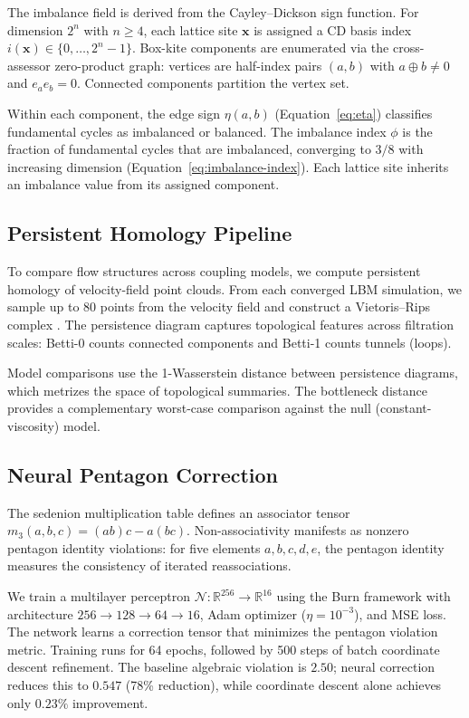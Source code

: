 \documentclass[12pt]{article}
\theoremstyle{definition}
\theoremstyle{plain}
\theoremstyle{remark}
\begin{document}
The imbalance field is derived from the Cayley--Dickson sign function.
For dimension $2^n$ with $n \geq 4$, each lattice site $\mathbf{x}$ is
assigned a CD basis index $i(\mathbf{x}) \in \{0, \ldots, 2^n - 1\}$.
Box-kite components are enumerated via the cross-assessor zero-product
graph: vertices are half-index pairs $(a, b)$ with $a \oplus b \neq 0$ and
$e_a e_b = 0$.  Connected components partition the vertex set.

Within each component, the edge sign $\eta(a,b)$ (Equation~\ref{eq:eta})
classifies fundamental cycles as imbalanced or balanced.  The
imbalance index $\phi$ is the fraction of fundamental cycles that are
imbalanced, converging to $3/8$ with increasing dimension
(Equation~\ref{eq:imbalance-index}).  Each lattice site inherits an imbalance
value from its assigned component.

\subsection{Persistent Homology Pipeline}
\label{sec:topology}

To compare flow structures across coupling models, we compute persistent
homology of velocity-field point clouds.  From each converged LBM
simulation, we sample up to 80 points from the velocity field and construct
a Vietoris--Rips complex \cite{EdelsbrunnerHarer2010}.  The persistence
diagram captures topological features across filtration scales:
Betti-0 counts connected components and Betti-1 counts tunnels (loops).

Model comparisons use the 1-Wasserstein distance between persistence
diagrams, which metrizes the space of topological summaries.  The
bottleneck distance provides a complementary worst-case comparison against
the null (constant-viscosity) model.

\subsection{Neural Pentagon Correction}
\label{sec:neural}

The sedenion multiplication table defines an associator tensor
$m_3(a, b, c) = (ab)c - a(bc)$.  Non-associativity manifests as nonzero
pentagon identity violations: for five elements $a, b, c, d, e$, the
pentagon identity measures the consistency of iterated reassociations.

We train a multilayer perceptron $\mathcal{N}: \mathbb{R}^{256} \to
\mathbb{R}^{16}$ using the Burn framework with architecture
$256 \to 128 \to 64 \to 16$, Adam optimizer ($\eta = 10^{-3}$), and MSE
loss.  The network learns a correction tensor that minimizes the pentagon
violation metric.  Training runs for 64 epochs, followed by 500 steps of
batch coordinate descent refinement.  The baseline algebraic violation is
$2.50$; neural correction reduces this to $0.547$ (78\% reduction), while
coordinate descent alone achieves only $0.23\%$ improvement.
\end{document}
